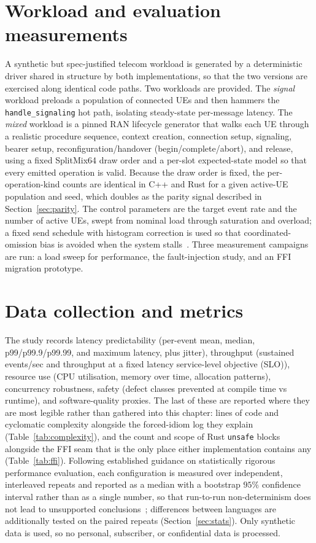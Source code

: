 \documentclass[english,twoside,openright,a4paper,censored,csm,software-track-2020]{HYthesisML}
\begin{document}
\section{Workload and evaluation measurements\label{sec:workload}}
A synthetic but spec-justified telecom workload is generated by a deterministic driver shared
in structure by both implementations, so that the two versions are exercised along identical
code paths. Two workloads are provided. The \emph{signal} workload preloads a population of
connected UEs and then hammers the \texttt{handle\_signaling} hot path, isolating steady-state
per-message latency. The \emph{mixed} workload is a pinned RAN lifecycle generator that walks
each UE through a realistic procedure sequence, context creation, connection setup, signaling,
bearer setup, reconfiguration/handover (begin/complete/abort), and release, using a fixed
SplitMix64 draw order and a per-slot expected-state model so that every emitted operation is
valid. Because the draw order is fixed, the per-operation-kind counts are identical in C++ and
Rust for a given active-UE population and seed, which doubles as the parity signal described in
Section~\ref{sec:parity}. The control parameters are the target event rate and the number of
active UEs, swept from nominal load through saturation and overload; a fixed send schedule with
histogram correction is used so that coordinated-omission bias is avoided when the system
stalls~\cite{tene_hdrhistogram}. Three measurement campaigns are run: a load sweep for
performance, the fault-injection study, and an FFI migration prototype.

\section{Data collection and metrics}
The study records latency predictability (per-event mean, median, p99/p99.9/p99.99, and
maximum latency, plus jitter), throughput (sustained events/sec and throughput at a fixed
latency service-level objective (SLO)), resource use (CPU utilisation, memory over time, allocation patterns),
concurrency robustness, safety (defect classes prevented at compile time vs runtime), and
software-quality proxies. The last of these are reported where they are most legible rather
than gathered into this chapter: lines of code and cyclomatic complexity alongside the
forced-idiom log they explain (Table~\ref{tab:complexity}), and the count and scope of Rust
\texttt{unsafe} blocks alongside the FFI seam that is the only place either implementation
contains any (Table~\ref{tab:ffi}). Following established guidance on statistically rigorous
performance evaluation, each configuration is measured over \NRepeats{} independent,
interleaved repeats and reported as a median with a bootstrap $95\%$ confidence interval rather
than as a single number, so that run-to-run non-determinism does not lead to unsupported
conclusions~\cite{georges2007rigorous}; differences between languages are additionally tested
on the paired repeats (Section~\ref{sec:stats}). Only synthetic data is used, so no personal,
subscriber, or confidential data is processed.
\end{document}
